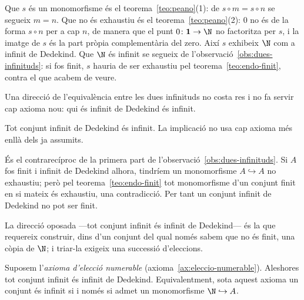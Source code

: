 \begin{prova}
Que \(s\) és un monomorfisme és el teorema~\ref{teo:peano}(1): de
\(s\circ m=s\circ n\) se segueix \(m=n\). Que no és exhaustiu és el
teorema~\ref{teo:peano}(2): \(0\) no és de la forma \(s\circ n\)
per a cap \(n\), de manera que el punt \(0\colon\mathbf1\to\N\) no factoritza
per \(s\), i la imatge de \(s\) és la part pròpia complementària del zero.
Així \(s\) exhibeix \(\N\) com a infinit de Dedekind. Que \(\N\) és
infinit se segueix de l'observació~\ref{obs:dues-infinituds}: si fos
finit, \(s\) hauria de ser exhaustiu pel teorema~\ref{teo:endo-finit},
contra el que acabem de veure.
\end{prova}

Una direcció de l'equivalència entre les dues infinituds no costa res i
no fa servir cap axioma nou: qui és infinit de Dedekind és infinit.

\begin{proposicio}\label{prop:dedekind-implica-infinit}
Tot conjunt infinit de Dedekind és infinit. La implicació no usa cap
axioma més enllà dels ja assumits.
\end{proposicio}

\begin{prova}
És el contrarecíproc de la primera part de
l'observació~\ref{obs:dues-infinituds}. Si \(A\) fos finit i infinit de
Dedekind alhora, tindríem un monomorfisme \(A\hookrightarrow A\) no
exhaustiu; però pel teorema~\ref{teo:endo-finit} tot monomorfisme d'un
conjunt finit en si mateix és exhaustiu, una contradicció. Per tant un
conjunt infinit de Dedekind no pot ser finit.
\end{prova}

La direcció oposada ---tot conjunt infinit és infinit de Dedekind--- és
la que requereix construir, dins d'un conjunt del qual només sabem que no
és finit, una còpia de \(\N\); i triar-la exigeix una successió d'eleccions.

\begin{teorema}\label{teo:infinit-implica-dedekind}
Suposem l'\emph{axioma d'elecció numerable}
(axioma~\ref{ax:eleccio-numerable}). Aleshores tot conjunt infinit és
infinit de Dedekind. Equivalentment, sota aquest axioma un conjunt és
infinit si i només si admet un monomorfisme \(\N\hookrightarrow A\).
\end{teorema}

